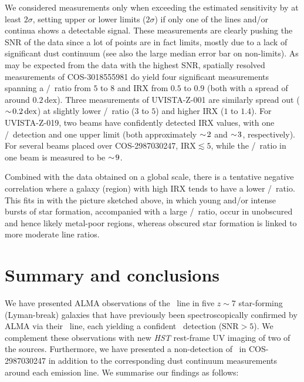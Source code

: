 We considered measurements only when exceeding the estimated sensitivity by at least $2 \sigma$, setting upper or lower limits ($2 \sigma$) if only one of the lines and/or continua shows a detectable signal. These measurements are clearly pushing the SNR of the data since a lot of points are in fact limits, mostly due to a lack of significant dust continuum (see also the large median error bar on non-limits). As may be expected from the data with the highest SNR, spatially resolved measurements of COS-3018555981 do yield four significant measurements spanning a \OIIIf/\CII\ ratio from $5$ to $8$ and IRX from $0.5$ to $0.9$ (both with a spread of around $0.2 \, \mathrm{dex}$). Three measurements of UVISTA-Z-001 are similarly spread out ($\sim \! 0.2 \, \mathrm{dex}$) at slightly lower \OIIIf/\CII\ ratio ($3$ to $5$) and higher IRX ($1$ to $1.4$). For UVISTA-Z-019, two beams have confidently detected IRX values, with one \OIIIf/\CII\ detection and one upper limit (both approximately $\sim \! 2$ and $\sim \! 3$, respectively). For several beams placed over COS-2987030247, $\text{IRX} \lesssim 5$, while the \OIIIf/\CII\ ratio in one beam is measured to be $\sim \! 9$.

Combined with the data obtained on a global scale, there is a tentative negative correlation where a galaxy (region) with high IRX tends to have a lower \OIIIf/\CII\ ratio. This fits in with the picture sketched above, in which young and/or intense bursts of star formation, accompanied with a large \OIIIf/\CII\ ratio, occur in unobscured and hence likely metal-poor regions, whereas obscured star formation is linked to more moderate line ratios.

\section{Summary and conclusions}
\label{chDsec:Summary}

We have presented ALMA observations of the \OIIILam\ line in five $z \sim 7$ star-forming (Lyman-break) galaxies that have previously been spectroscopically confirmed by ALMA via their \CIILam\ line, each yielding a confident \OIIIf\ detection ($\text{SNR} > 5$). We complement these observations with new \textit{HST} rest-frame UV imaging of two of the sources. Furthermore, we have presented a non-detection of \NIILam\ in COS-2987030247 in addition to the corresponding dust continuum measurements around each emission line. We summarise our findings as follows:

